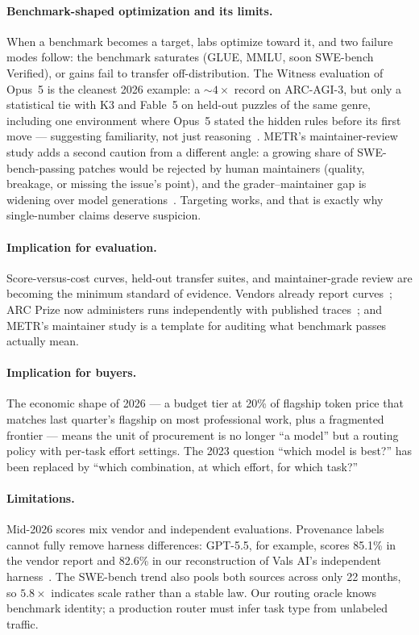 \paragraph{Benchmark-shaped optimization and its limits.} When a benchmark
becomes a target, labs optimize toward it, and two failure modes follow: the
benchmark saturates (GLUE, MMLU, soon SWE-bench Verified), or gains fail to
transfer off-distribution. The Witness evaluation of Opus~5 is the cleanest
2026 example: a ${\sim}4\times$ record on ARC-AGI-3, but only a statistical tie
with K3 and Fable~5 on held-out puzzles of the same genre, including one
environment where Opus~5 stated the hidden rules before its first move ---
suggesting familiarity, not just reasoning~\cite{decoder2026opus5,techtimes2026opus5}.
METR's maintainer-review study adds a second caution from a different angle:
a growing share of SWE-bench-passing patches would be rejected by human
maintainers (quality, breakage, or missing the issue's point), and the
grader--maintainer gap is widening over model
generations~\cite{metr2026swebench}. Targeting works, and that is exactly why
single-number claims deserve suspicion.

\paragraph{Implication for evaluation.} Score-versus-cost curves, held-out
transfer suites, and maintainer-grade review are becoming the minimum standard
of evidence. Vendors already report curves~\cite{anthropic2026opus5}; ARC Prize
now administers runs independently with published
traces~\cite{arcprize2026opus5, techtimes2026opus5}; and METR's maintainer
study is a template for auditing what benchmark passes actually mean.

\paragraph{Implication for buyers.} The economic shape of 2026 --- a budget
tier at 20\% of flagship token price that matches last quarter's flagship on most
professional work, plus a fragmented frontier --- means the unit of procurement
is no longer ``a model'' but a routing policy with per-task effort settings.
The 2023 question ``which model is best?'' has been replaced by ``which
combination, at which effort, for which task?''

\paragraph{Limitations.} Mid-2026 scores mix vendor and independent
evaluations. Provenance labels cannot fully remove harness differences:
GPT-5.5, for example, scores 85.1\% in the vendor report and 82.6\% in our
reconstruction of Vals AI's independent
harness~\cite{localaimaster2026gpt55,vals2026swebench}. The SWE-bench trend
also pools both sources across only 22 months, so $5.8\times$ indicates scale
rather than a stable law. Our routing oracle knows benchmark identity; a
production router must infer task type from unlabeled traffic.

